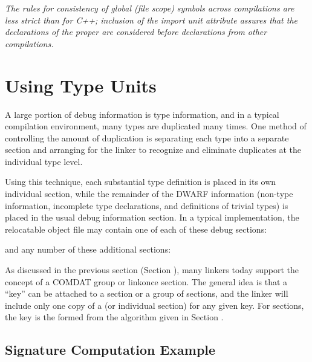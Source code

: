 \textit{The  rules for consistency of global (file scope) symbols
across compilations are less strict than for C++; inclusion
of the import unit attribute assures that the declarations of
the proper  are considered before declarations
from other compilations.}


\section{Using Type Units}
\label{app:usingtypeunits}

A large portion of debug information is type information, and
in a typical compilation environment, many types are duplicated
many times. One method of controlling the amount of duplication
is separating each type into a separate 
\dotdebugtypes{} section
and arranging for the linker to recognize and eliminate
duplicates at the individual type level.

Using this technique, each substantial type definition is
placed in its own individual section, while the remainder
of the DWARF information (non-type information, incomplete
type declarations, and definitions of trivial types) is
placed in the usual debug information section. In a typical
implementation, the relocatable object file may contain one
of each of these debug sections:

\begin{alltt}
\dotdebugabbrev{}
\dotdebuginfo{}
\dotdebugline{}
\end{alltt}

and any number of these additional sections:

\begin{alltt}
\dotdebugtypes{}
\end{alltt}

As discussed in the previous section 
(Section ), 
many
linkers today support the concept of a COMDAT group or
linkonce section. The general idea is that a ``key'' can be
attached to a section or a group of sections, and the linker
will include only one copy of a 
(or individual section) for any given key. 
For 
\dotdebugtypes{} sections, the
key is the 
formed from the algorithm given in
Section .

\subsection{Signature Computation Example}
\label{app:signaturecomputationexample}

